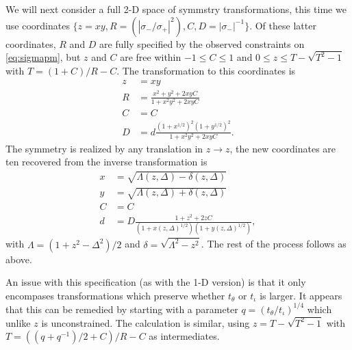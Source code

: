 \documentclass[aps,showpacs,twocolumn,prd,superscriptaddress,nofootinbib]{revtex4}
\begin{document}
We will next consider a full 2-D space of symmstry transformations, this time we use coordinates $\{{z=xy,R=(|\sigma_-/\sigma_+|^2),C,D=|\sigma_-|^{-1}}\}$.  Of these latter coordinates, $R$ and $D$ are fully specified by the observed constraints on \eqref{eq:sigmapm}, but $z$ and $C$ are free within $-1\leq C\leq1$ and $0\leq z\leq T-\sqrt{T^2-1}$ with $T=(1+C)/R-C$. The transformation to this coordinates is
\begin{align}
  z&=xy\\
  R&=\frac{x^2+y^2+2xyC}{1+x^2y^2+2xyC}\\
  C&=C\\
  D&=d\frac{(1+x^{1/2})^2(1+y^{1/2})^2}{1+x^2y^2+2xyC}.
\end{align}
The symmetry is realized by any translation in $z\rightarrow z$, the new coordinates are ten recovered from the inverse transformation is 
\begin{align}
  x&=\sqrt{\Lambda(z,\Delta)-\delta(z,\Delta)}\\
  y&=\sqrt{\Lambda(z,\Delta)+\delta(z,\Delta)}\\
  C&=C\\
  d&=D\frac {1+z^2+2zC}{(1+x(z,\Delta)^{1/2})(1+y(z,\Delta)^{1/2})},
\end{align}
with $\Lambda=(1+z^2-\Delta^2)/2$ and $\delta=\sqrt{\Lambda^2-z^2}$.
The rest of the process follows as above.

An issue with this specification (as with the 1-D version) is that it only encompases transformations which preserve whether $t_\theta$ or $t_\iota$ is larger.  It appears that this can be remedied by starting with a parameter $q=(t_\theta/t_\iota)^{1/4}$ which unlike $z$ is unconstrained. The calculation is similar, using $z=T-\sqrt{T^2-1}$ with $T=((q+q^{-1})/2+C)/R-C$ as intermediates.
\end{document}
